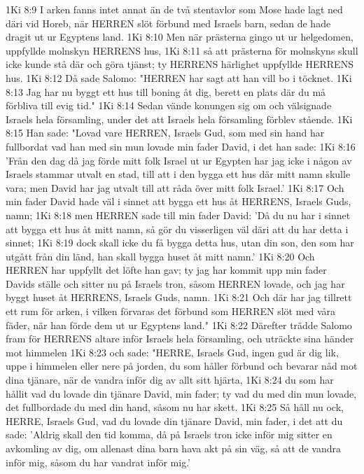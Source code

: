 1Ki 8:9  I arken fanns intet annat än de två stentavlor som Mose hade lagt ned däri vid Horeb, när HERREN slöt förbund med Israels barn, sedan de hade dragit ut ur Egyptens land.
1Ki 8:10  Men när prästerna gingo ut ur helgedomen, uppfyllde molnskyn HERRENS hus,
1Ki 8:11  så att prästerna för molnskyns skull icke kunde stå där och göra tjänst; ty HERRENS härlighet uppfyllde HERRENS hus.
1Ki 8:12  Då sade Salomo: "HERREN har sagt att han vill bo i töcknet.
1Ki 8:13  Jag har nu byggt ett hus till boning åt dig, berett en plats där du må förbliva till evig tid."
1Ki 8:14  Sedan vände konungen sig om och välsignade Israels hela församling, under det att Israels hela församling förblev stående.
1Ki 8:15  Han sade: "Lovad vare HERREN, Israels Gud, som med sin hand har fullbordat vad han med sin mun lovade min fader David, i det han sade:
1Ki 8:16  'Från den dag då jag förde mitt folk Israel ut ur Egypten har jag icke i någon av Israels stammar utvalt en stad, till att i den bygga ett hus där mitt namn skulle vara; men David har jag utvalt till att råda över mitt folk Israel.'
1Ki 8:17  Och min fader David hade väl i sinnet att bygga ett hus åt HERRENS, Israels Guds, namn;
1Ki 8:18  men HERREN sade till min fader David: 'Då du nu har i sinnet att bygga ett hus åt mitt namn, så gör du visserligen väl däri att du har detta i sinnet;
1Ki 8:19  dock skall icke du få bygga detta hus, utan din son, den som har utgått från din länd, han skall bygga huset åt mitt namn.'
1Ki 8:20  Och HERREN har uppfyllt det löfte han gav; ty jag har kommit upp min fader Davids ställe och sitter nu på Israels tron, såsom HERREN lovade, och jag har byggt huset åt HERRENS, Israels Guds, namn.
1Ki 8:21  Och där har jag tillrett ett rum för arken, i vilken förvaras det förbund som HERREN slöt med våra fäder, när han förde dem ut ur Egyptens land."
1Ki 8:22  Därefter trädde Salomo fram för HERRENS altare inför Israels hela församling, och uträckte sina händer mot himmelen
1Ki 8:23  och sade: "HERRE, Israels Gud, ingen gud är dig lik, uppe i himmelen eller nere på jorden, du som håller förbund och bevarar nåd mot dina tjänare, när de vandra inför dig av allt sitt hjärta,
1Ki 8:24  du som har hållit vad du lovade din tjänare David, min fader; ty vad du med din mun lovade, det fullbordade du med din hand, såsom nu har skett.
1Ki 8:25  Så håll nu ock, HERRE, Israels Gud, vad du lovade din tjänare David, min fader, i det att du sade: 'Aldrig skall den tid komma, då på Israels tron icke inför mig sitter en avkomling av dig, om allenast dina barn hava akt på sin väg, så att de vandra inför mig, såsom du har vandrat inför mig.'
